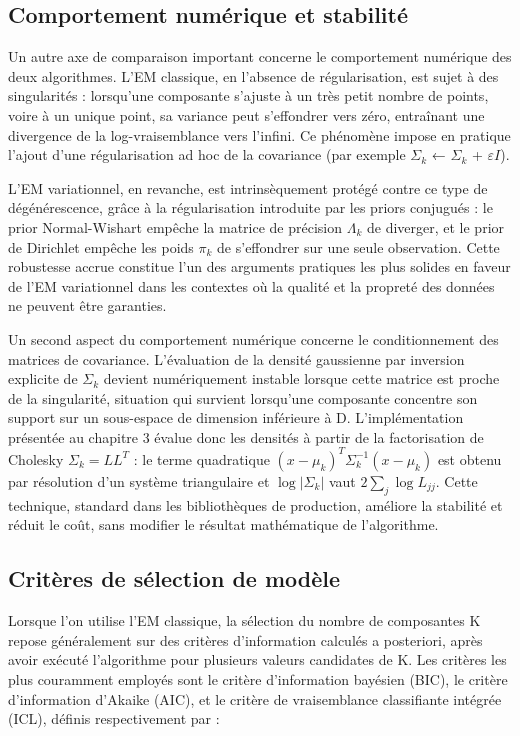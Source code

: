 \subsection{Comportement numérique et stabilité}
Un autre axe de comparaison important concerne le comportement numérique des deux algorithmes. L'EM classique, en l'absence de régularisation, est sujet à des singularités : lorsqu'une composante s'ajuste à un très petit nombre de points, voire à un unique point, sa variance peut s'effondrer vers zéro, entraînant une divergence de la log-vraisemblance vers l'infini. Ce phénomène impose en pratique l'ajout d'une régularisation ad hoc de la covariance (par exemple $\Sigma _{k}$ ← $\Sigma _{k}$ + $\varepsilon I$).

L'EM variationnel, en revanche, est intrinsèquement protégé contre ce type de dégénérescence, grâce à la régularisation introduite par les priors conjugués : le prior Normal-Wishart empêche la matrice de précision $\Lambda _{k}$ de diverger, et le prior de Dirichlet empêche les poids $\pi _{k}$ de s'effondrer sur une seule observation. Cette robustesse accrue constitue l'un des arguments pratiques les plus solides en faveur de l'EM variationnel dans les contextes où la qualité et la propreté des données ne peuvent être garanties.

Un second aspect du comportement numérique concerne le conditionnement des matrices de covariance. L'évaluation de la densité gaussienne par inversion explicite de $\Sigma _{k}$ devient numériquement instable lorsque cette matrice est proche de la singularité, situation qui survient lorsqu'une composante concentre son support sur un sous-espace de dimension inférieure à D. L'implémentation présentée au chapitre 3 évalue donc les densités à partir de la factorisation de Cholesky $\Sigma _{k} = LL^{T}$ : le terme quadratique $(x-\mu _{k})^{T}\Sigma _{k}^{-1}(x-\mu _{k})$ est obtenu par résolution d'un système triangulaire et $\log |\Sigma _{k}|$ vaut $2\sum _{j}\log L_{jj}$. Cette technique, standard dans les bibliothèques de production, améliore la stabilité et réduit le coût, sans modifier le résultat mathématique de l'algorithme.

\subsection{Critères de sélection de modèle}
Lorsque l'on utilise l'EM classique, la sélection du nombre de composantes K repose généralement sur des critères d'information calculés a posteriori, après avoir exécuté l'algorithme pour plusieurs valeurs candidates de K. Les critères les plus couramment employés sont le critère d'information bayésien (BIC), le critère d'information d'Akaike (AIC), et le critère de vraisemblance classifiante intégrée (ICL), définis respectivement par :

